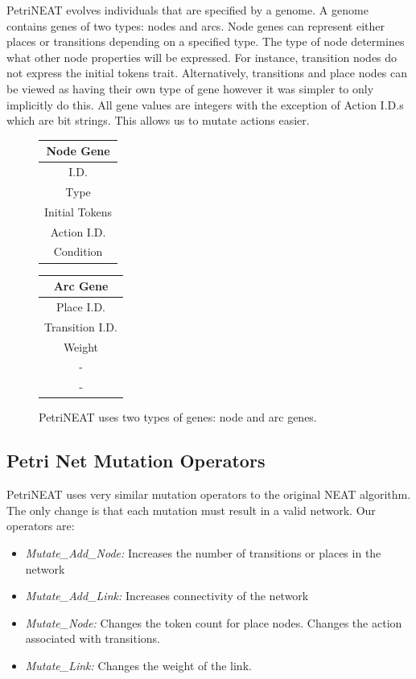 \documentclass[12pt,a4paper,twocolumn]{article}
\begin{document}
PetriNEAT evolves individuals that are specified by a genome. A genome contains genes of two types: nodes and arcs. Node genes can represent either places or transitions depending on a specified type. The type of node determines what other node properties will be expressed. For instance, transition nodes do not express the initial tokens trait. Alternatively, transitions and place nodes can be viewed as having their own type of gene however it was simpler to only implicitly do this. All gene values are integers with the exception of Action I.D.s which are bit strings. This allows us to mutate actions easier.

\begin{figure}
\centering
\begin{tabular}{|c|}
\hline
Node Gene\\ \hline
I.D. \\
Type \\
Initial Tokens \\
Action I.D. \\
Condition \\
\hline
\end{tabular}
\begin{tabular}{|c|}
\hline
Arc Gene\\ \hline
Place I.D.\\
Transition I.D.\\
Weight \\
 - \\
 -\\
\hline
\end{tabular}
\caption{PetriNEAT uses two types of genes: node and arc genes.}
\end{figure}


\subsection{Petri Net Mutation Operators}

PetriNEAT uses very similar mutation operators to the original NEAT algorithm. The only change is that each mutation must result in a valid network. Our operators are:
\begin{itemize}
\item \emph{Mutate{\_}Add{\_}Node:} Increases the number of transitions or places in the network
\item \emph{Mutate{\_}Add{\_}Link:}  Increases connectivity of the network
\item \emph{Mutate{\_}Node:}  Changes the token count for place nodes. Changes the action associated with transitions.
\item \emph{Mutate{\_}Link:} Changes the weight of the link.
\end{itemize}
\end{document}
